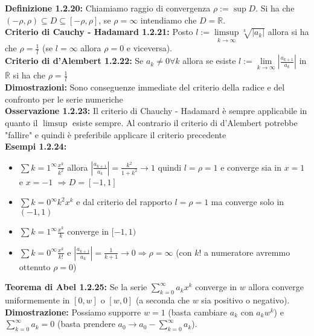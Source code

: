 \documentclass[a4paper,11pt,titlepage]{book}
\begin{document}
\textbf{Definizione 1.2.20:} Chiamiamo raggio di convergenza $\rho := \sup D$. Si ha che $(-\rho,\rho)\subseteq D \subseteq [-\rho,\rho]$, se $\rho=\infty$ intendiamo che $D=\mathbb{R}$.\\

\textbf{Criterio di Cauchy - Hadamard 1.2.21:} Posto $l:=\limsup\limits_{k\to\infty}\sqrt[k]{|a_k|}$ allora si ha che $\rho=\frac{1}{l}$ (se $l=\infty$ allora $\rho=0$ e viceversa).\\

\textbf{Criterio di d'Alembert 1.2.22:} Se $a_k \ne 0 \forall k$ allora se esiste $l:=\lim\limits_{k\to\infty} \left|\frac{a_{k+1}}{a_k}\right|$ in $\overline{\mathbb{R}}$ si ha che $\rho=\frac{1}{l}$\\

\textbf{Dimostrazioni:} Sono conseguenze immediate del criterio della radice e del confronto per le serie numeriche\\

\textbf{Osservazione 1.2.23:} Il criterio di Chauchy - Hadamard è sempre applicabile in quanto il $\limsup$ esiste sempre. Al contrario il criterio di d'Alembert potrebbe "fallire" e quindi è preferibile applicare il criterio precedente\\

\textbf{Esempi 1.2.24:} \begin{itemize}
\item $\sum{k=1}^{\infty}\frac{x^k}{k^2}$ allora $\left|\frac{a_{k+1}}{a_k}\right|=\frac{k^2}{1+k^2}\to 1$ quindi $l=\rho=1$ e converge sia in $x=1$ e $x=-1$ $\Rightarrow D=[-1,1]$
\item $\sum{k=0}^{\infty} k^2x^k$ e dal criterio del rapporto $l=\rho=1$ ma converge solo in $(-1,1)$
\item $\sum{k=1}^{\infty}\frac{x^k}{k}$ converge in $[-1,1)$
\item $\sum{k=0}^{\infty}\frac{x^k}{k!}$  e $\left | \frac{a_{k+1}}{a_k}\right|=\frac{1}{k+1}\to 0\Rightarrow\rho = \infty$ (con $k!$ a numeratore avremmo ottenuto $\rho=0$)\\
\end{itemize}

\textbf{Teorema di Abel 1.2.25:} Se la serie $\sum_{k=0}^{\infty}a_k x^k$ converge in $w$ allora converge uniformemente in $[0,w]$ o $[w,0]$ (a seconda che $w$ sia positivo o negativo).\\

\textbf{Dimostrazione: }Possiamo supporre $w=1$ (basta cambiare $a_k$ con $a_kw^k$) e $\sum_{k=0}^\infty a_k=0$ (basta prendere $a_0\to a_0-\sum_{k=0}^\infty a_k$).\\
\end{document}
